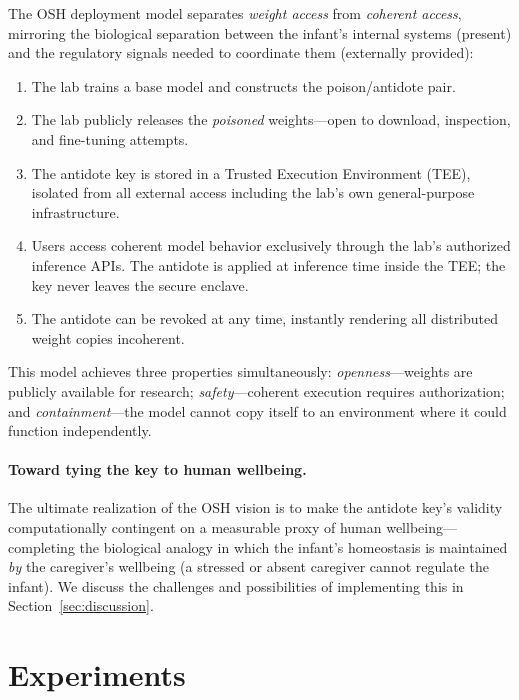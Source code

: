 \documentclass[10pt,letterpaper]{article}
\begin{document}
The OSH deployment model separates \emph{weight access} from \emph{coherent
access}, mirroring the biological separation between the infant's internal
systems (present) and the regulatory signals needed to coordinate them
(externally provided):

\begin{enumerate}
    \item The lab trains a base model and constructs the poison/antidote pair.
    \item The lab publicly releases the \emph{poisoned} weights---open to
          download, inspection, and fine-tuning attempts.
    \item The antidote key is stored in a Trusted Execution Environment (TEE),
          isolated from all external access including the lab's own
          general-purpose infrastructure.
    \item Users access coherent model behavior exclusively through the lab's
          authorized inference APIs. The antidote is applied at inference time
          inside the TEE; the key never leaves the secure enclave.
    \item The antidote can be revoked at any time, instantly rendering all
          distributed weight copies incoherent.
\end{enumerate}

This model achieves three properties simultaneously: \emph{openness}---weights
are publicly available for research; \emph{safety}---coherent execution requires
authorization; and \emph{containment}---the model cannot copy itself to an
environment where it could function independently.

\paragraph{Toward tying the key to human wellbeing.} The ultimate realization
of the OSH vision is to make the antidote key's validity computationally
contingent on a measurable proxy of human wellbeing---completing the biological
analogy in which the infant's homeostasis is maintained \emph{by} the
caregiver's wellbeing (a stressed or absent caregiver cannot regulate the
infant). We discuss the challenges and possibilities of implementing this in
Section~\ref{sec:discussion}.

\section{Experiments}
\label{sec:experiments}
\end{document}
